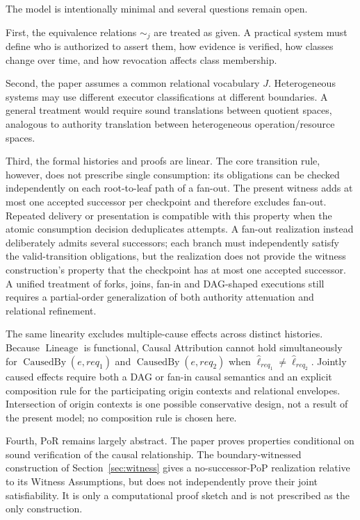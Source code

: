 \documentclass[10pt,twocolumn]{article}
\begin{document}
The model is intentionally minimal and several questions remain open.

First, the equivalence relations \(\sim_j\) are treated as given. A practical
system must define who is authorized to assert them, how evidence is verified,
how classes change over time, and how revocation affects class membership.

Second, the paper assumes a common relational vocabulary \(J\). Heterogeneous
systems may use different executor classifications at different boundaries. A
general treatment would require sound translations between quotient spaces,
analogous to authority translation between heterogeneous operation/resource
spaces.

Third, the formal histories and proofs are linear. The core transition rule,
however, does not prescribe single consumption: its obligations can be checked
independently on each root-to-leaf path of a fan-out. The present witness adds
at most one accepted successor per checkpoint and therefore excludes fan-out.
Repeated delivery or presentation is compatible with this property when the
atomic consumption decision deduplicates attempts. A fan-out realization
instead deliberately admits several successors; each branch must independently
satisfy the valid-transition obligations, but the realization does not provide
the witness construction's property that the checkpoint has at most one
accepted successor. A unified treatment of forks, joins, fan-in and DAG-shaped
executions still requires a partial-order generalization of both authority
attenuation and relational refinement.

The same linearity excludes multiple-cause effects across distinct histories.
Because \(\operatorname{Lineage}\) is functional, Causal Attribution cannot
hold simultaneously for
\(\operatorname{CausedBy}(e,req_1)\) and
\(\operatorname{CausedBy}(e,req_2)\) when
\(\widehat{\ell}_{req_1}\neq\widehat{\ell}_{req_2}\). Jointly caused effects
require both a DAG or fan-in causal semantics and an explicit composition rule
for the participating origin contexts and relational envelopes. Intersection
of origin contexts is one possible conservative design, not a result of the
present model; no composition rule is chosen here.

Fourth, PoR remains largely abstract. The paper proves properties conditional
on sound verification of the causal relationship. The boundary-witnessed
construction of Section~\ref{sec:witness} gives a no-successor-PoP realization
relative to its Witness Assumptions, but does not independently prove their
joint satisfiability. It is only a computational proof sketch and is not
prescribed as the only construction.
\end{document}
